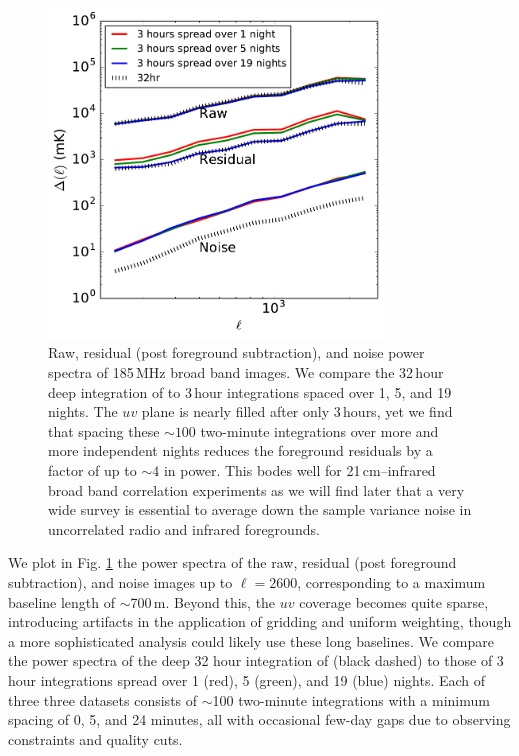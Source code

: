 \documentclass{emulateapj}
\begin{document}
\begin{figure}[h]
\centering
\includegraphics[width=3.5in]{images/res_pspec_of_100_obsids_with_diff_spacings_6amin.pdf}
\caption{Raw, residual (post foreground subtraction), and noise power spectra of 185\,MHz broad band images. We compare the 32\,hour deep integration of \citet{beardsley16} to 3\,hour integrations spaced over 1, 5, and 19 nights. The $uv$ plane is nearly filled after only 3\,hours, yet we find that spacing these $\sim100$ two-minute integrations over more and more independent nights reduces the foreground residuals by a factor of up to $\sim4$ in power. This bodes well for 21\,cm--infrared broad band correlation experiments as we will find later that a very wide survey is essential to average down the sample variance noise in uncorrelated radio and infrared foregrounds.}
\label{fig:respspecspacingsstudy}
\end{figure}

We plot in Fig. \ref{fig:respspecspacingsstudy} the power spectra of the raw, residual (post foreground subtraction), and noise images up to $\ell=2600$, corresponding to a maximum baseline length of $\sim$700\,m. Beyond this, the $uv$ coverage becomes quite sparse, introducing artifacts in the application of gridding and uniform weighting, though a more sophisticated analysis could likely use these long baselines. We compare the power spectra of the deep 32 hour integration of \citet{beardsley16} (black dashed) to those of 3 hour integrations spread over 1 (red), 5 (green), and 19 (blue) nights. Each of three three datasets consists of $\sim$100 two-minute integrations with a minimum spacing of 0, 5, and 24 minutes, all with occasional few-day gaps due to observing constraints and quality cuts. 
\end{document}
